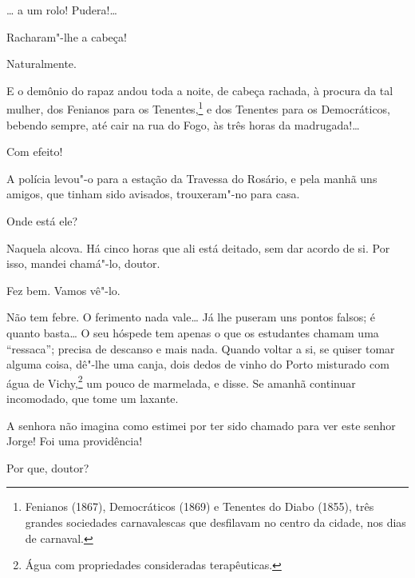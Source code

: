 \ldots{} a um rolo! Pudera!\ldots{}

 Racharam"-lhe a cabeça!

 Naturalmente.

 E o demônio do rapaz andou toda a noite, de cabeça
rachada, à procura da tal mulher, dos Fenianos para os Tenentes,\footnote{
Fenianos (1867), Democráticos (1869) e Tenentes do Diabo (1855), três grandes
sociedades carnavalescas que desfilavam no centro da cidade, nos dias de
carnaval.} e dos
Tenentes para os Democráticos, bebendo sempre, até cair na rua do Fogo,
às três horas da madrugada!\ldots{}

 Com efeito!

 A polícia levou"-o para a estação da Travessa do Rosário, e
pela manhã uns amigos, que tinham sido avisados, trouxeram"-no para
casa.

 Onde está ele?

 Naquela alcova. Há cinco horas que ali está deitado, sem
dar acordo de si. Por isso, mandei chamá"-lo, doutor.

 Fez bem. Vamos vê"-lo. 



  Não tem febre.
 O ferimento nada vale\ldots{} Já
lhe puseram uns pontos falsos; é quanto basta\ldots{} O seu hóspede tem
apenas o que os estudantes chamam uma “ressaca”; precisa de descanso e
mais nada. Quando voltar a si, se quiser tomar alguma coisa, dê"-lhe uma
canja, dois dedos de vinho do Porto misturado com água de
Vichy,\footnote{ Água com propriedades consideradas terapêuticas.} 
um pouco de marmelada, e disse. Se amanhã continuar
incomodado, que tome um laxante.



  A senhora não imagina como
estimei por ter sido chamado para ver este senhor Jorge! Foi uma
providência!

 Por que, doutor?

